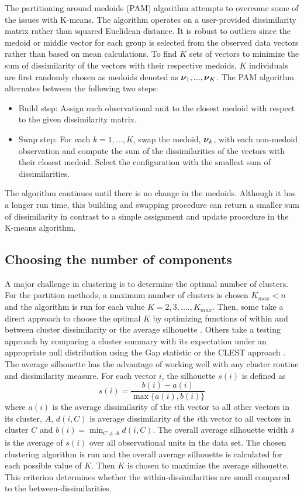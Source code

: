 The partitioning around medoids (PAM) algorithm attempts to overcome some of the issues with K-means. The algorithm operates on a user-provided dissimilarity matrix rather than squared Euclidean distance. It is robust to outliers since the medoid or middle vector for each group is selected from the observed data vectors rather than based on mean calculations. To find $K$ sets of vectors to minimize the sum of dissimilarity of the vectors with their respective medoids, $K$ individuals are first randomly chosen as medoids denoted as $\boldsymbol \nu_{1},...,\boldsymbol \nu_{K}$. The PAM algorithm alternates between the following two steps:
 \begin{itemize}
\item Build step: Assign each observational unit to the closest medoid with respect to the given dissimilarity matrix.
\item Swap step: For each $k=1,...,K$, swap the medoid, $\boldsymbol\nu_{k}$, with each non-medoid observation and compute the sum of the dissimilarities of the vectors with their closest medoid. Select the configuration with the smallest sum of dissimilarities.
\end{itemize}
The algorithm continues until there is no change in the medoids. Although it has a longer run time, this building and swapping procedure can return a smaller sum of dissimilarity in contrast to a simple assignment and update procedure in the K-means algorithm. 

\subsection{Choosing the number of components}
A major challenge in clustering is to determine the optimal number of clusters. For the partition methods, a maximum number of clusters is chosen $K_{max}<n$ and the algorithm is run for each value $K=2,3,....,K_{max}$. Then, some take a direct approach to choose the optimal $K$  by optimizing functions of within and between cluster dissimilarity \cite{mulligan1985} or the average silhouette \cite{kaufman1990}. Others take a testing approach by comparing a cluster summary with its expectation under an appropriate null distribution using the Gap statistic \cite{tibshirani2001} or the CLEST approach \cite{dudoit2002}. The average silhouette has the advantage of working well with any cluster routine and dissimilarity measure. For each vector $i$, the silhouette $s(i)$ is defined as
$$s(i)=\frac{b(i)-a(i)}{\max\{a(i),b(i)\}}$$
where $a(i)$ is the average dissimilarity of the $i$th vector to all other vectors in its cluster, $A$, $d(i,C)$ is average dissimilarity of the $i$th vector to all vectors in cluster $C$ and $b(i)=\min_{C\not= A} d(i,C)$. The overall average silhouette width $\bar{s}$ is the average of $s(i)$ over all observational units in the data set. The chosen clustering algorithm is run and the overall average silhouette is calculated for each possible value of $K$. Then $K$ is chosen to maximize the average silhouette. This criterion determines whether the within-dissimilarities are small compared to the between-dissimilarities. 

